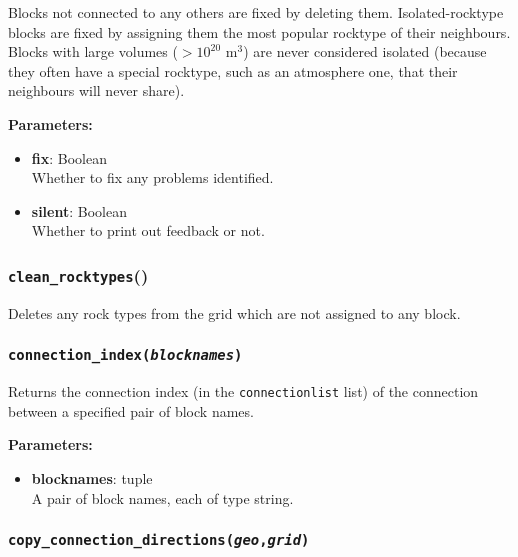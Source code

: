 Blocks not connected to any others are fixed by deleting them.  Isolated-rocktype blocks are fixed by assigning them the most popular rocktype of their neighbours.  Blocks with large volumes ($> 10^{20}$ m$^3$) are never considered isolated (because they often have a special rocktype, such as an atmosphere one, that their neighbours will never share).

\textbf{Parameters:}
\begin{itemize}
\item \textbf{fix}: Boolean\\
  Whether to fix any problems identified.
\item \textbf{silent}: Boolean\\
  Whether to print out feedback or not.
\end{itemize}

\begin{snugshade}
\subsubsection{\texttt{clean\_rocktypes}()}
\end{snugshade}
\label{sec:t2grid:clean_rocktypes}

Deletes any rock types from the grid which are not assigned to any block.

\begin{snugshade}
\subsubsection{\texttt{connection\_index(\emph{blocknames})}}
\end{snugshade}
\label{sec:t2grid:connection_index}

Returns the connection index (in the \texttt{connectionlist} list) of the connection between a specified pair of block names.

\textbf{Parameters:}
\begin{itemize}
\item \textbf{blocknames}: tuple\\
  A pair of block names, each of type string.
\end{itemize}

\begin{snugshade}
\subsubsection{\texttt{copy\_connection\_directions(\emph{geo},\emph{grid})}}
\end{snugshade}
\label{sec:t2grid:copy_connection_directions}

